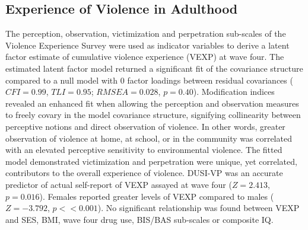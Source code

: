 \documentclass[utf8]{article}
\begin{document}
\subsection{Experience of Violence in Adulthood} The perception, observation, victimization and perpetration sub-scales of the Violence Experience Survey were used as indicator variables to derive a latent factor estimate of cumulative violence experience (VEXP) at wave four. The estimated latent factor model returned a significant fit of the covariance structure compared to a null model with $0$ factor loadings between residual covariances ($CFI = 0.99$, $TLI = 0.95$; $RMSEA = 0.028$, $p = 0.40$). Modification indices revealed an enhanced fit when allowing the perception and observation measures to freely covary in the model covariance structure, signifying collinearity between perceptive notions and direct observation of violence. In other words, greater observation of violence at home, at school, or in the community was correlated with an elevated perceptive sensitivity to environmental violence. The fitted model demonstrated victimization and perpetration were unique, yet correlated, contributors to the overall experience of violence. DUSI-VP was an accurate predictor of actual self-report of VEXP assayed at wave four ($Z=2.413$, $p=0.016$). Females reported greater levels of VEXP compared to males ($Z=-3.792$, $p<<0.001$). No significant relationship was found between VEXP and SES, BMI, wave four drug use, BIS/BAS sub-scales or composite IQ.  

\end{document}
